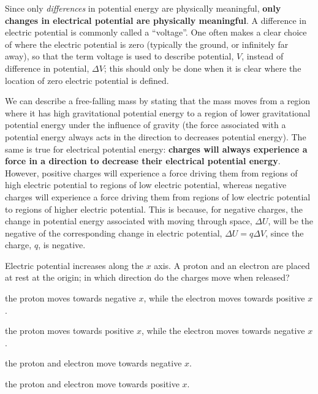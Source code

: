 Since only \textit{differences} in potential energy are physically meaningful, \textbf{only changes in electrical potential are physically meaningful}. A difference in electric potential is commonly called a ``voltage''. One often makes a clear choice of where the electric potential is zero (typically the ground, or infinitely far away), so that the term voltage is used to describe potential, $V$, instead of difference in potential, $\Delta V$; this should only be done when it is clear where the location of zero electric potential is defined.

We can describe a free-falling mass by stating that the mass moves from a region where it has high gravitational potential energy to a region of lower gravitational potential energy under the influence of gravity (the force associated with a potential energy always acts in the direction to decreases potential energy). The same is true for electrical potential energy: \textbf{charges will always experience a force in a direction to decrease their electrical potential energy}. However, positive charges will experience a force driving them from regions of high electric potential to regions of low electric potential, whereas negative charges will experience a force driving them from regions of low electric potential to regions of higher electric potential. This is because, for negative charges, the change in potential energy associated with moving through space, $\Delta U$, will be the negative of the corresponding change in electric potential, $\Delta U=q\Delta V$, since the charge, $q$, is negative. 

\begin{checkpoint}
	\begin{MCquestion}{Electric potential increases along the $x$ axis. A proton and an electron are placed at rest at the origin; in which direction do the charges move when released?}
		\item the proton moves towards negative $x$, while the electron moves towards positive $x$. \correct
		\item the proton moves towards positive $x$, while the electron moves towards negative $x$.
		\item the proton and electron move towards negative $x$.
		\item the proton and electron move towards positive $x$.
	\end{MCquestion}
\end{checkpoint}

